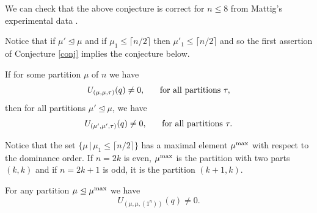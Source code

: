 We can check that the above conjecture is correct for $n\leq 8$ from Mattig's experimental data \cite{Lu}.


Notice that if $\mu'\trianglelefteq\mu$ and if $\mu_1\leq \lceil n/2\rceil$ then $\mu'_1\leq \lceil n/2\rceil$ and so the first assertion of Conjecture \ref{conj} implies the conjecture below.



\begin{conj}If for some partition $\mu$ of $n$ we have 
	$$
	U_{(\mu,\mu,\tau)}(q)\neq 0,\hspace{.5cm}\text{  for all partitions }\tau,
	$$
	then for all partitions $\mu'\trianglelefteq \mu$, we have 
	$$
	U_{(\mu',\mu',\tau)}(q)\neq 0,\hspace{.5cm}\text{  for all partitions }\tau.
	$$
	
	\label{weak}\end{conj}






Notice that the set $\{\mu\,|\, \mu_1\leq \lceil n/2\rceil\}$ has a maximal element $\mu^{\rm max}$ with respect to the dominance order. If $n=2k$ is even, $\mu^{\rm max}$ is the partition with two parts $(k,k)$ and if $n=2k+1$ is odd, it is the partition $(k+1,k)$.



\begin{theo}For any partition $\mu\trianglelefteq\mu^{\rm max}$ we have 
	$$
	U_{(\mu,\mu,(1^n))}(q)\neq 0.
	$$
	\label{theo2}\end{theo}

